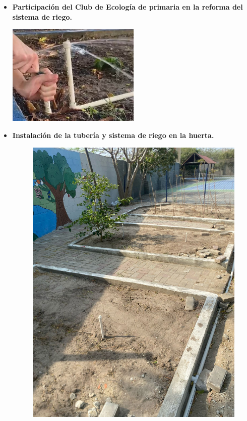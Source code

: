 \documentclass[12pt]{article}
\begin{document}
\begin{itemize}
      \item \textbf{Participación del Club de Ecología de primaria en la reforma del sistema de riego.}
            \begin{center}
                  \includegraphics[width=0.5\textwidth]{imagenes/sprinkler.jpg}
            \end{center}
            \newpage
      \item \textbf{Instalación de la tubería y sistema de riego en la huerta.}
            \begin{figure}[h!]
                  \centering
                  \begin{minipage}[b]{0.48\textwidth}
                        \includegraphics[width=\textwidth]{imagenes/sprinkler2.jpg}

\end{minipage}
\end{figure}
\end{itemize}
\end{document}

